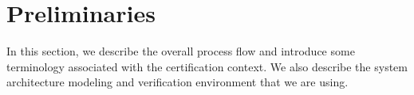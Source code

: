 \section{Preliminaries}
\label{sec:prelims}
In this section, we describe the overall process flow and introduce some terminology associated with the certification context. We also describe the system architecture modeling and verification environment that we are using.





